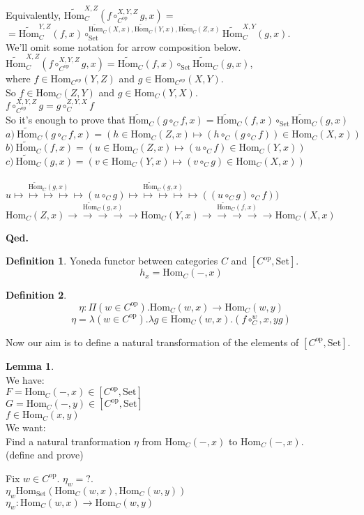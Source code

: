 \documentclass[10pt,a4paper]{article}
\theoremstyle{definition}
\newtheorem{definition}{Definition}[section]
\newtheorem{lemma}{Lemma}[section]
\newcommand{\Hom}{{\mbox{Hom}}}
\newcommand{\HomMor}{{\widetilde{\Hom}\mbox{}}}
\newcommand{\op}{{\mbox{op}}}
\newcommand{\Set}{{\mbox{Set}}}
\newcommand{\myqed}{\noindent\textbf{Qed.}}
\begin{document}
\begin{enumerate}
Equivalently, $\HomMor_C^{X,Z}(f\circ_{C^\op}^{X,Y,Z} g, x)=$\\ $=\HomMor_C^{Y,Z}(f,x)\circ_\Set^{\HomMor_C(X,x),\HomMor_C(Y,x),\HomMor_C(Z,x)} \HomMor_C^{X,Y}(g,x)$.\\
We'll omit some notation for arrow composition below.\\
$\HomMor_C^{X,Z}(f\circ_{C^\op}^{X,Y,Z} g, x)=\HomMor_C(f,x)\circ_\Set \HomMor_C(g,x)$,\\
where $f\in\Hom_{C^\op}(Y,Z)$ and $g\in\Hom_{C^\op}(X,Y)$.\\
So $f\in\Hom_{C}(Z,Y)$ and $g\in\Hom_{C}(Y,X)$.\\
$f\circ_{C^\op}^{X,Y,Z} g = g\circ_{C}^{Z,Y,X} f$\\
So it's enough to prove that $\HomMor_C(g\circ_C f, x) = \HomMor_C(f, x) \circ_\Set \HomMor_C(g, x)$\\
$a)\ \HomMor_C(g\circ_C f, x) = (h \in\Hom_C(Z,x) \mapsto (h \circ_C (g\circ_C f))\in\Hom_C(X,x))$\\
$b)\ \HomMor_C(f, x) = \left(u \in\Hom_C(Z,x) \mapsto (u \circ_C f)\in\Hom_C(Y,x)\right)$\\
$c)\ \HomMor_C(g, x) = \left(v \in\Hom_C(Y,x) \mapsto (v \circ_C g)\in\Hom_C\left(X,x\right)\right)$\\
\\
$u \stackrel{\HomMor_C(g, x)}{\mapsto\mapsto\mapsto\mapsto\mapsto} (u \circ_C g)\stackrel{\HomMor_C(g, x)}{\mapsto\mapsto\mapsto\mapsto\mapsto} ((u \circ_C g) \circ_C f))$
\\
$\Hom_C(Z,x) \stackrel{\HomMor_C(g, x)}{\to\to\to\to\to} \Hom_C(Y,x)\stackrel{\HomMor_C(f, x)}{\to\to\to\to\to} \Hom_C(X,x)$
\\
\end{enumerate}
\myqed
\begin{definition}
Yoneda functor between categories $C$ and $[C^\op,\Set]$.
$$h_x = \Hom_C(-, x)$$
\end{definition}


\begin{definition}
$$\eta : \Pi(w\in C^\op).\Hom_C(w,x)\to \Hom_C(w,y)$$
$$\eta = \lambda (w\in C^\op). \lambda g\in\Hom_C(w,x).(f\circ_C^w,x,y g)$$
\end{definition}
Now our aim is to define a natural transformation of the elements of $[C^\op,\Set]$.\\
\begin{lemma}$\mbox{ }$\\
We have:\\
$F=\Hom_C(-,x)\in [C^\op,\Set]$\\
$G=\Hom_C(-,y)\in [C^\op,\Set]$\\
$f\in\Hom_C(x,y)$\\
We want:\\
Find a natural tranformation $\eta$ from $\Hom_C(-,x)$ to $\Hom_C(-,x)$.\\ (define and prove)\\
\end{lemma}
Fix $w\in C^\op$. $\eta_w = ?$.\\
$\eta_w\Hom_\Set(\Hom_C(w,x),\Hom_C(w,y))$\\
$\eta_w: \Hom_C(w,x)\to \Hom_C(w,y)$\\
\end{document}
